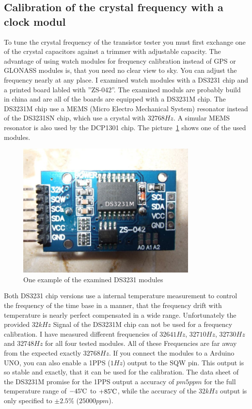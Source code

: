 \subsection{Calibration of the crystal frequency with a clock modul}

To tune the crystal frequency of the transistor tester you must first exchange one of the
crystal capacitors against a trimmer with adjustable capacity.
The advantage of using watch modules for frequency calibration instead of GPS or GLONASS modules is,
that you need no clear view to sky. You can adjust the frequency nearly at any place.
I examined watch modules with a DS3231 chip and a printed board labled with ''ZS-042''.
The examined moduls are probably build in china and are all of the boards are equipped
with a DS3231M chip. The DS3231M chip use a MEMS (Micro Electro Mechanical System) resonator 
instead of the DS3231SN chip, which use a crystal with \(32768Hz\).
A simular MEMS resonator is also used by the DCP1301 chip.
The picture~\ref{fig:DS3231M} shows one of the used modules.

\begin{figure}[H]
\centering
\includegraphics[width=9cm]{../PNG/DS3231M.jpg}
\caption{One example of the examined DS3231 modules}
\label{fig:DS3231M}
\end{figure}

Both DS3231 chip versions use a internal temperature measurement to control the frequency of
the time base in a manner, that the frequency drift with temperature is nearly
perfect compensated in a wide range.
Unfortunately the provided \(32kHz\) Signal of the DS3231M chip can not be used for a
frequency calibration. I have measured different frequencies of \(32641Hz\), \(32710Hz\),
\(32730Hz\) and \(32748Hz\) for all four tested modules. 
All of these Frequencies are far away from the expected exactly \(32768Hz\).
If you connect the modules to a Arduino UNO, you can also enable a 1PPS (\(1Hz\)) output
to the SQW pin.
This output is so stable and exactly, that it can be used for the calibration.
The data sheet of the DS3231M promise for the 1PPS output a accuracy of \(pm 5ppm\) for
the full temperature range of \(-45\celsius\) to \(+85\celsius\), while the accuracy of the
\(32kHz\) output is only specified to \(\pm 2.5\%\) (\(25000ppm\)).

